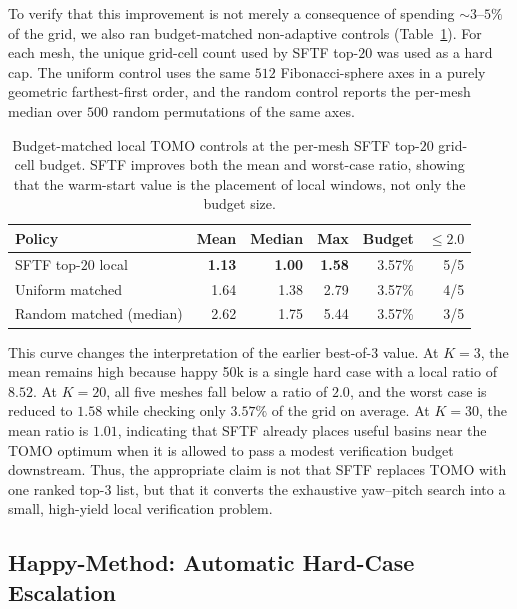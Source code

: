 \documentclass[11pt,a4paper]{article}
\begin{document}
To verify that this improvement is not merely a consequence of spending $\sim$$3$--$5\%$ of the grid,
we also ran budget-matched non-adaptive controls (Table~\ref{tab:budget-matched-baseline}).
For each mesh, the unique grid-cell count used by SFTF top-$20$ was used as a hard cap.
The uniform control uses the same $512$ Fibonacci-sphere axes in a purely geometric farthest-first order,
and the random control reports the per-mesh median over $500$ random permutations of the same axes.

\begin{table}[H]
\centering
\caption{Budget-matched local TOMO controls at the per-mesh SFTF top-$20$ grid-cell budget.
SFTF improves both the mean and worst-case ratio, showing that the warm-start value is the placement of local windows, not only the budget size.}
\label{tab:budget-matched-baseline}
\small
\begin{tabular}{lrrrrr}
\toprule
Policy & Mean & Median & Max & Budget & $\le 2.0$\\
\midrule
SFTF top-$20$ local & \textbf{1.13} & \textbf{1.00} & \textbf{1.58} & 3.57\% & 5/5\\
Uniform matched & 1.64 & 1.38 & 2.79 & 3.57\% & 4/5\\
Random matched (median) & 2.62 & 1.75 & 5.44 & 3.57\% & 3/5\\
\bottomrule
\end{tabular}
\end{table}

This curve changes the interpretation of the earlier best-of-3 value.
At $K=3$, the mean remains high because happy 50k is a single hard case with a local ratio of $8.52$.
At $K=20$, all five meshes fall below a ratio of $2.0$, and the worst case is reduced to $1.58$ while checking only $3.57\%$ of the grid on average.
At $K=30$, the mean ratio is $1.01$, indicating that SFTF already places useful basins near the TOMO optimum when it is allowed to pass a modest verification budget downstream.
Thus, the appropriate claim is not that SFTF replaces TOMO with one ranked top-3 list,
but that it converts the exhaustive yaw--pitch search into a small, high-yield local verification problem.

\subsection{Happy-Method: Automatic Hard-Case Escalation}
\label{sec:happy-method}
\end{document}
